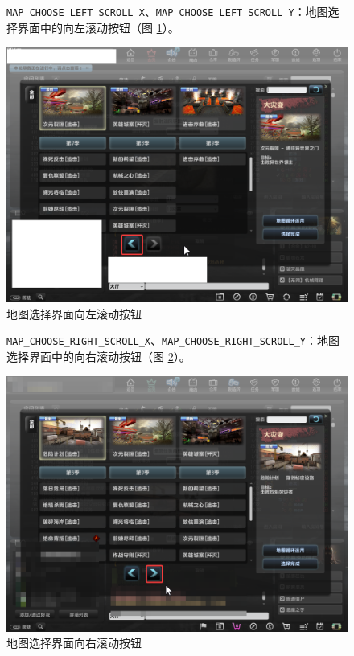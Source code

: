 \begin{figure}[H]
    \Centering
    \parbox[l]{\textwidth}{\lstinline{MAP_CHOOSE_LEFT_SCROLL_X}、\lstinline{MAP_CHOOSE_LEFT_SCROLL_Y}：地图选择界面中的向左滚动按钮（图 \ref{ch2fig-left-scroll}）。}
    \includegraphics[width=\textwidth]{docs/assets/left_scroll.png}
    \caption{地图选择界面向左滚动按钮}
    \label{ch2fig-left-scroll}
\end{figure}
\clearpage

\begin{figure}[H]
    \Centering
    \parbox[l]{\textwidth}{\lstinline{MAP_CHOOSE_RIGHT_SCROLL_X}、\lstinline{MAP_CHOOSE_RIGHT_SCROLL_Y}：地图选择界面中的向右滚动按钮（图 \ref{ch2fig-right-scroll}）。}
    \includegraphics[width=\textwidth]{docs/assets/right_scroll.png}
    \caption{地图选择界面向右滚动按钮}
    \label{ch2fig-right-scroll}
\end{figure}
\clearpage

